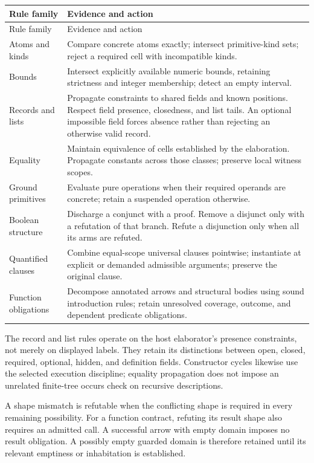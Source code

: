 \documentclass[11pt,a4paper,oneside]{report}
\theoremstyle{remark}
\begin{document}
\begin{longtable}{@{}P{0.25\textwidth}P{0.69\textwidth}@{}}
\toprule
Rule family & Evidence and action\\\midrule
\endfirsthead
\toprule Rule family & Evidence and action\\\midrule
\endhead
Atoms and kinds & Compare concrete atoms exactly; intersect primitive-kind
sets; reject a required cell with incompatible kinds.\\
Bounds & Intersect explicitly available numeric bounds, retaining strictness
and integer membership; detect an empty interval.\\
Records and lists & Propagate constraints to shared fields and known positions.
Respect field presence, closedness, and list tails. An optional impossible field
forces absence rather than rejecting an otherwise valid record.\\
Equality & Maintain equivalence of cells established by the elaboration.
Propagate constants across those classes; preserve local witness scopes.\\
Ground primitives & Evaluate pure operations when their required operands are
concrete; retain a suspended operation otherwise.\\
Boolean structure & Discharge a conjunct with a proof. Remove a disjunct only
with a refutation of that branch. Refute a disjunction only when all its arms
are refuted.\\
Quantified clauses & Combine equal-scope universal clauses pointwise; instantiate
at explicit or demanded admissible arguments; preserve the original clause.\\
Function obligations & Decompose annotated arrows and structural bodies using
sound introduction rules; retain unresolved coverage, outcome, and dependent
predicate obligations.\\\bottomrule
\end{longtable}

The record and list rules operate on the host elaborator's presence constraints,
not merely on displayed labels. They retain its distinctions between open,
closed, required, optional, hidden, and definition fields. Constructor cycles
likewise use the selected execution discipline; equality propagation does not
impose an unrelated finite-tree occurs check on recursive descriptions.

A shape mismatch is refutable when the conflicting shape is required in every
remaining possibility. For a function contract, refuting its result shape also
requires an admitted call. A successful arrow with empty domain imposes no
result obligation. A possibly empty guarded domain is therefore retained until
its relevant emptiness or inhabitation is established.
\end{document}

